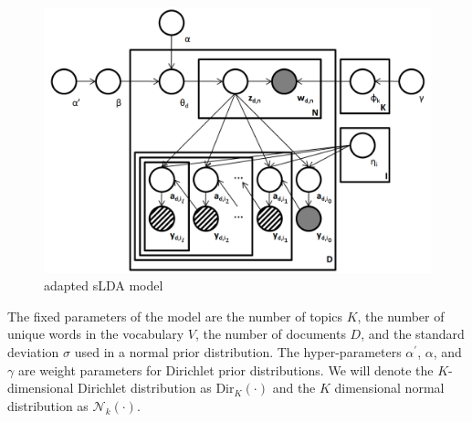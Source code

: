 \documentclass{article}
\begin{document}
%
%
\begin{figure}[h]
 \centering \includegraphics[scale=0.3]{Graphical_Model2} \caption{adapted sLDA model}
\label{fig:example} 
\end{figure}
%
The fixed parameters of the model are the number of topics $K$, the number of unique words in the vocabulary $V$, the number of documents $D$, and the standard deviation $\sigma$ used in a normal prior distribution.  The hyper-parameters $\alpha^\prime$, $\alpha$, and $\gamma$ are weight parameters for Dirichlet prior distributions. We will denote the $K$-dimensional Dirichlet distribution as Dir$_K(\cdot)$ and the $K$ dimensional normal distribution as $\mathcal{N}_k(\cdot)$.
\end{document}
